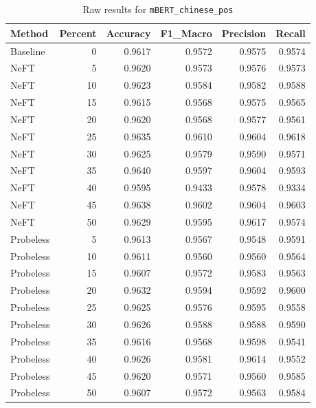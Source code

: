 \documentclass[12pt]{article}
\begin{document}
\begin{table}[H]
\centering
\caption{Raw results for \texttt{mBERT\_chinese\_pos}}
\label{tab:mbert-chinese-pos}
\begin{tabular}{lrrrrr}
\toprule
Method & Percent & Accuracy & F1\_Macro & Precision & Recall \\
\midrule
Baseline & 0 & 0.9617 & 0.9572 & 0.9575 & 0.9574 \\
NeFT & 5 & 0.9620 & 0.9573 & 0.9576 & 0.9573 \\
NeFT & 10 & 0.9623 & 0.9584 & 0.9582 & 0.9588 \\
NeFT & 15 & 0.9615 & 0.9568 & 0.9575 & 0.9565 \\
NeFT & 20 & 0.9620 & 0.9568 & 0.9577 & 0.9561 \\
NeFT & 25 & 0.9635 & 0.9610 & 0.9604 & 0.9618 \\
NeFT & 30 & 0.9625 & 0.9579 & 0.9590 & 0.9571 \\
NeFT & 35 & 0.9640 & 0.9597 & 0.9604 & 0.9593 \\
NeFT & 40 & 0.9595 & 0.9433 & 0.9578 & 0.9334 \\
NeFT & 45 & 0.9638 & 0.9602 & 0.9604 & 0.9603 \\
NeFT & 50 & 0.9629 & 0.9595 & 0.9617 & 0.9574 \\
Probeless & 5 & 0.9613 & 0.9567 & 0.9548 & 0.9591 \\
Probeless & 10 & 0.9611 & 0.9560 & 0.9560 & 0.9564 \\
Probeless & 15 & 0.9607 & 0.9572 & 0.9583 & 0.9563 \\
Probeless & 20 & 0.9632 & 0.9594 & 0.9592 & 0.9600 \\
Probeless & 25 & 0.9625 & 0.9576 & 0.9595 & 0.9558 \\
Probeless & 30 & 0.9626 & 0.9588 & 0.9588 & 0.9590 \\
Probeless & 35 & 0.9616 & 0.9568 & 0.9598 & 0.9541 \\
Probeless & 40 & 0.9626 & 0.9581 & 0.9614 & 0.9552 \\
Probeless & 45 & 0.9620 & 0.9571 & 0.9560 & 0.9585 \\
Probeless & 50 & 0.9607 & 0.9572 & 0.9563 & 0.9584 \\
\bottomrule
\end{tabular}
\end{table}
\end{document}
